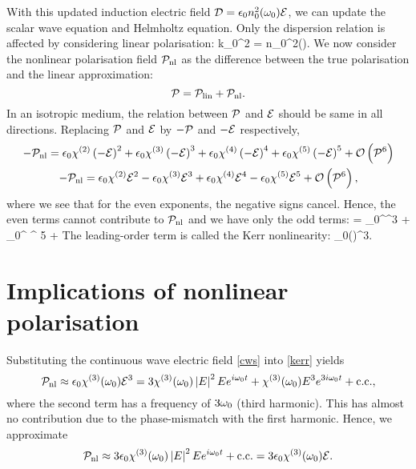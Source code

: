 With this updated induction electric field $\mathcal{D}=\epsilon_0 n_0^2(\omega_0)\mathcal{E}$, we
can update the scalar wave equation and Helmholtz equation. Only the dispersion
relation is affected by considering linear polarisation:
%
\be \label{ldisp} 
k_0^2 = n_0^2(\ww).
\ee
%
We now consider the nonlinear polarisation field $\mathcal{P}_\text{nl}$ 
as the difference between the true polarisation and the linear approximation:
$$\mathcal{P}=\mathcal{P}_\text{lin}+\mathcal{P}_\text{nl}.$$
%
In an isotropic medium, the relation between $\mathcal{P}$ and $\mathcal{E}$ should be
same in all directions. Replacing $\mathcal{P}$ and $\mathcal{E}$ by $-\mathcal{P}$ and $-\mathcal{E}$
respectively, 
%
\begin{gather*}
-\mathcal{P}_\text{nl} = \epsilon_0\chi^\text{(2)}\left(-\mathcal{E}\right) ^2 +
\epsilon_0\chi^\text{(3)}\left(-\mathcal{E}\right)^3 +
\epsilon_0\chi^\text{(4)}\left(-\mathcal{E}\right)^4 +
\epsilon_0\chi^\text{(5)}\left(-\mathcal{E}\right) ^ 5 + \mathcal{O}\left(\mathcal{P}^6\right)\\
-\mathcal{P}_\text{nl} = \epsilon_0\chi^\text{(2)}\mathcal{E} ^2 -
\epsilon_0\chi^\text{(3)}\mathcal{E}^3 +
\epsilon_0\chi^\text{(4)}\mathcal{E}^4 -
\epsilon_0\chi^\text{(5)}\mathcal{E} ^ 5 + \mathcal{O}\left(\mathcal{P}^6\right),
\end{gather*}
%
where we see that for the even exponents, the negative signs cancel. Hence, the
even terms cannot contribute to $\mathcal{P}_\text{nl}$ and we have only the odd terms: 
\be \label{pno}
\pn = \epsilon_0\chi^^3 +
\epsilon_0\chi^ ^ 5 + 
\ee
%
The leading-order term is called the Kerr nonlinearity:
\be
\label{kerr} \pn \approx \epsilon_0\ca(\ww)\ec^3.
\ee

\section{Implications of nonlinear polarisation}
Substituting the continuous wave electric field \eqref{cws} into 
\cref{kerr} yields
$$ \mathcal{P}_\text{nl} \approx \epsilon_0 \chi^{\text{(3)}}(\omega_0) \mathcal{E}^3 = 
3 \chi^{\text{(3)}}(\omega_0) \left|E\right|^2 E e^{i\omega_0 t} + 
\chi^{\text{(3)}}(\omega_0) E^3 e^{3i\omega_0 t} + \text{c.c.},$$
%
where the second term has a frequency of $3\omega_0$ (third harmonic). 
This has almost no contribution due to the phase-mismatch with the first harmonic.
Hence, we approximate
%
$$ \mathcal{P}_\text{nl} \approx 3 \epsilon_0 \chi^{\text{(3)}}(\omega_0) \left|E\right|^2 E e^{i\omega_0 t} 
+ \text{c.c.} = 3 \epsilon_0 \chi^{\text{(3)}}(\omega_0) \mathcal{E}. $$

